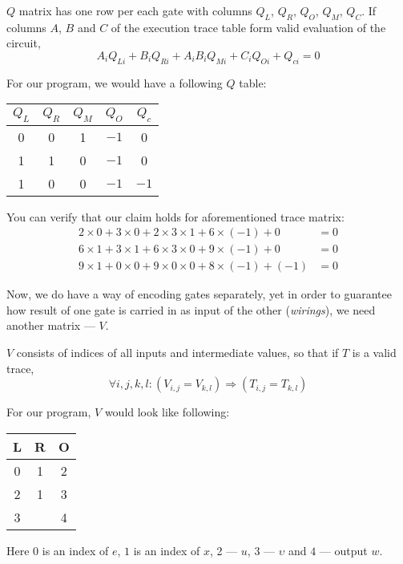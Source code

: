 \documentclass[../lecture-notes.tex]{subfiles}
\begin{document}
\begin{definition}
$Q$ matrix has one row per each gate with columns $Q_L$, $Q_R$, $Q_O$, $Q_M$, $Q_C$. If columns $A$, $B$ and $C$ of the execution trace table form valid evaluation of the circuit, 
\[A_i Q_{Li} + B_i Q_{Ri} + A_i B_i Q_{Mi} + C_i Q_{Oi} + Q_{ci} = 0\]
\end{definition}

\begin{example}

For our program, we would have a following $Q$ table:
\begin{center}
\begin{tabular}{|c|c|c|c|c|}
\hline
$Q_L$ & $Q_R$ & $Q_M$ & $Q_O$ & $Q_c$ \\ 
\hline
0 & 0 & 1 & $-1$ & 0 \\ 
\hline
1 & 1 & 0 & $-1$ & 0 \\ 
\hline
1 & 0 & 0 & $-1$ & $-1$ \\ 
\hline
\end{tabular}
\end{center}

You can verify that our claim holds for aforementioned trace matrix:
\begin{align*}
  2 \times 0 + 3 \times 0 + 2 \times 3 \times 1 + 6 \times (-1) + 0 &= 0 \\
  6 \times 1 + 3 \times 1 + 6 \times 3 \times 0 + 9 \times (-1) + 0 &= 0 \\
  9 \times 1 + 0 \times 0 + 9 \times 0 \times 0 + 8 \times (-1) + (-1) &= 0 
\end{align*}
\end{example}

Now, we do have a way of encoding gates separately, yet in order to guarantee how result of one gate is carried in as input of the other (\textit{wirings}), we need another matrix --- $V$.

\begin{definition}
$V$ consists of indices of all inputs and intermediate values, so that if $T$ is a valid trace,
\[\forall i, j, k, l: (V_{i,j} = V_{k,l}) \Rightarrow (T_{i,j} = T_{k,l})\]
\end{definition}

\begin{example}
For our program, $V$ would look like following:
\begin{center}
\begin{tabular}{|c|c|c|}
\hline
L & R & O \\
\hline
0 & 1 & 2 \\
\hline
2 & 1 & 3 \\
\hline
3 &  & 4 \\
\hline
\end{tabular}
\end{center}
Here $0$ is an index of $e$, $1$ is an index of $x$, 2 --- $u$, 3 --- $\upsilon$ and $4$ --- output $w$.
\end{example}
\end{document}
